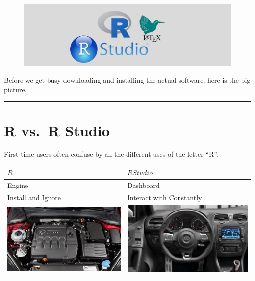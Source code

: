 \documentclass[]{book}
\begin{document}
\begin{figure}
\centering
\includegraphics{images/headers/R_studio_LaTeX_header.png}
\caption{}
\end{figure}

Before we get busy downloading and installing the actual software, here
is the big picture.

\begin{center}\rule{0.5\linewidth}{\linethickness}\end{center}

\section{R vs.~R Studio}\label{r-vs.r-studio}

First time users often confuse by all the different uses of the letter
``R''.

\begin{longtable}[]{@{}ll@{}}
\toprule
\(R\) & \(R Studio\)\tabularnewline
\midrule
\endhead
Engine & Dashboard\tabularnewline
Install and Ignore & Interact with Constantly\tabularnewline
\includegraphics[width=5.20833in]{images/car_engine.jpg} &
\includegraphics[width=5.20833in]{images/car_dashboard.jpg}\tabularnewline
\bottomrule
\end{longtable}
\end{document}
